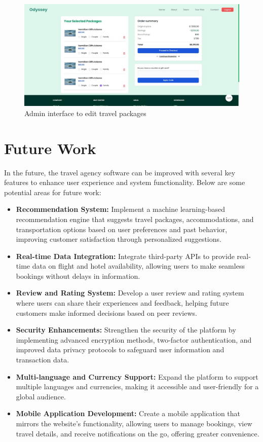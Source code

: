 \documentclass{scrreprt}
\begin{document}
\begin{figure}[h!]
    \centering
    \includegraphics[width=1.1\textwidth, height=0.4\textheight]{./SS/pkg_edit.jpg}
    \caption{Admin interface to edit travel packages}
    \label{fig:pkg_edit}
\end{figure}

\chapter{Future Work}
In the future, the travel agency software can be improved with several key features to enhance user experience and system functionality. Below are some potential areas for future work:

\begin{itemize}
    \item \textbf{Recommendation System:} Implement a machine learning-based recommendation engine that suggests travel packages, accommodations, and transportation options based on user preferences and past behavior, improving customer satisfaction through personalized suggestions.
    
    \item \textbf{Real-time Data Integration:} Integrate third-party APIs to provide real-time data on flight and hotel availability, allowing users to make seamless bookings without delays in information.
    
    \item \textbf{Review and Rating System:} Develop a user review and rating system where users can share their experiences and feedback, helping future customers make informed decisions based on peer reviews.
    
    \item \textbf{Security Enhancements:} Strengthen the security of the platform by implementing advanced encryption methods, two-factor authentication, and improved data privacy protocols to safeguard user information and transaction data.
    
    \item \textbf{Multi-language and Currency Support:} Expand the platform to support multiple languages and currencies, making it accessible and user-friendly for a global audience.
    
    \item \textbf{Mobile Application Development:} Create a mobile application that mirrors the website’s functionality, allowing users to manage bookings, view travel details, and receive notifications on the go, offering greater convenience.
\end{itemize}
\end{document}
